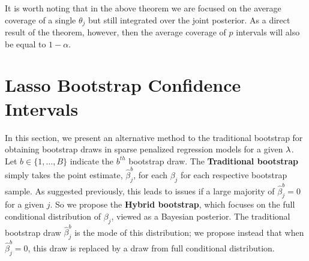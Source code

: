 It is worth noting that in the above theorem we are focused on the average coverage of a single $\theta_j$ but still integrated over the joint posterior. As a direct result of the theorem, however, then the average coverage of $p$ intervals will also be equal to $1-\alpha$. 

%


\section{Lasso Bootstrap Confidence Intervals}\label{Sec:methods}

In this section, we present an alternative method to the traditional bootstrap for obtaining bootstrap draws in sparse penalized regression models for a given $\lambda$. Let $b \in \lbrace 1, \ldots, B \rbrace$ indicate the $b^{th}$ bootstrap draw. The \textbf{Traditional bootstrap} simply takes the point estimate, $\hat{\beta}_j^b$, for each $\beta_j$ for each respective bootstrap sample. As suggested previously, this leads to issues if a large majority of $\hat{\beta}_j^b = 0$ for a given $j$. So we propose the \textbf{Hybrid bootstrap}, which focuses on the full conditional distribution of $\beta_j$, viewed as a Bayesian posterior. The traditional bootstrap draw $\hat{\beta}_j^b$ is the mode of this distribution; we propose instead that when $\hat{\beta}_j^b = 0$, this draw is replaced by a draw from full conditional distribution.

